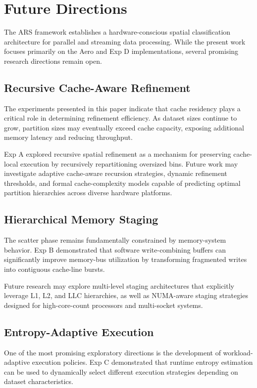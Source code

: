 \section{Future Directions}
The ARS framework establishes a hardware-conscious spatial classification architecture for parallel and streaming data processing.
While the present work focuses primarily on the Aero and Exp D implementations, several promising research directions remain open.

\subsection{Recursive Cache-Aware Refinement}
The experiments presented in this paper indicate that cache residency plays a critical role in determining refinement efficiency.
As dataset sizes continue to grow, partition sizes may eventually exceed cache capacity, exposing additional memory latency and reducing throughput.

Exp A explored recursive spatial refinement as a mechanism for preserving cache-local execution by recursively repartitioning oversized bins.
Future work may investigate adaptive cache-aware recursion strategies, dynamic refinement thresholds, and formal cache-complexity models capable of predicting optimal partition hierarchies across diverse hardware platforms.

\subsection{Hierarchical Memory Staging}
The scatter phase remains fundamentally constrained by memory-system behavior.
Exp B demonstrated that software write-combining buffers can significantly improve memory-bus utilization by transforming fragmented writes into contiguous cache-line bursts.

Future research may explore multi-level staging architectures that explicitly leverage L1, L2, and LLC hierarchies, as well as NUMA-aware staging strategies designed for high-core-count processors and multi-socket systems.

\subsection{Entropy-Adaptive Execution}
One of the most promising exploratory directions is the development of workload-adaptive execution policies.
Exp C demonstrated that runtime entropy estimation can be used to dynamically select different execution strategies depending on dataset characteristics.

